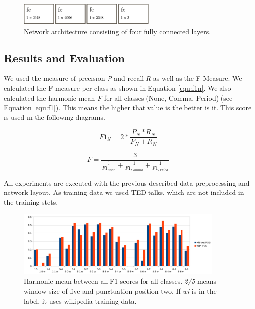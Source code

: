 \begin{figure}[ht]
    \centering
    \includegraphics[width=0.6\textwidth]{img/net_lexical.pdf}
    \caption{Network architecture consisting of four fully connected layers.}
    \label{fig:net_lexical}
\end{figure}

\subsection{Results and Evaluation}

We used the measure of precision \emph{P} and recall \emph{R} as well as the F-Measure. We calculated the F measure per class as shown in Equation \ref{equ:f1n}.
We also calculated the harmonic mean \emph{F} for all classes (None, Comma, Period) (see Equation \ref{equ:f1}). This means the higher that value is the better is it. This score is used in the following diagrams.

\begin{equation}
\label{equ:f1n}
F1_{N} = 2 * \frac{P_{N}* R_{N}}{P_{N}+R_{N}}
\end{equation}

\begin{equation}
\label{equ:f1}
F = \frac{3}{\frac{1}{F1_{None}} + \frac{1}{F1_{Comma}} + \frac{1}{F1_{Period}}}
\end{equation}

All experiments are executed with the previous described data preprocessing and network layout.
As training data we used TED talks, which are not included in the training stets.

\begin{figure}[ht]
    \centering
    \includegraphics[width=0.9\textwidth]{img/window_eval.png}
    \caption{Harmonic mean between all F1 scores for all classes. \emph{2/5} means window size of five and punctuation position two. If \emph{wi} is in the label, it uses wikipedia training data.}
    \label{fig:window_eval}
\end{figure}

